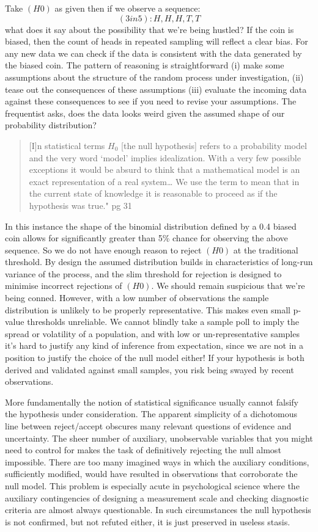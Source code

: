 \documentclass[]{tufte-book}
\theoremstyle{definition}
\theoremstyle{definition}
\theoremstyle{definition}
\theoremstyle{remark}
\begin{document}
Take \((H0)\) as given then if we observe a sequence: \[ (3in5): H, H, H, T, T\] what does it say about the possibility that we're being hustled? If the coin is biased, then the count of heads in repeated sampling will reflect a clear bias. For any new data we can check if the data is consistent with the data generated by the biased coin. The pattern of reasoning is straightforward (i) make some assumptions about the structure of the random process under investigation, (ii) tease out the consequences of these assumptions (iii) evaluate the incoming data against these consequences to see if you need to revise your assumptions. The frequentist asks, does the data looks weird given the assumed shape of our probability distribution?

\begin{quote}
{[}I{]}n statistical terms \(H_{0}\) {[}the null hypothesis{]} refers to a probability model and the very word `model' implies idealization. With a very few possible exceptions it would be absurd to think that a mathematical model is an exact representation of a real system\ldots{} We use the term to mean that in the current state of knowledge it is reasonable to proceed as if the hypothesis was true." pg 31 \citep{cox2006pos}
\end{quote}

In this instance the shape of the binomial distribution defined by a 0.4 biased coin allows for significantly greater than 5\% chance for observing the above sequence. So we do not have enough reason to reject \((H0)\) at the traditional threshold. By design the assumed distribution builds in characteristics of long-run variance of the process, and the slim threshold for rejection is designed to minimise incorrect rejections of \((H0)\). We should remain suspicious that we're being conned. However, with a low number of observations the sample distribution is unlikely to be properly representative. This makes even small p-value thresholds unreliable. We cannot blindly take a sample poll to imply the spread or volatility of a population, and with low or un-representative samples it's hard to justify any kind of inference from expectation, since we are not in a position to justify the choice of the null model either! If your hypothesis is both derived and validated against small samples, you risk being swayed by recent observations.

More fundamentally the notion of statistical significance usually cannot falsify the hypothesis under consideration. The apparent simplicity of a dichotomous line between reject/accept obscures many relevant questions of evidence and uncertainty. The sheer number of auxiliary, unobservable variables that you might need to control for makes the task of definitively rejecting the null almost impossible. There are too many imagined ways in which the auxiliary conditions, sufficiently modified, would have resulted in observations that corroborate the null model. This problem is especially acute in psychological science where the auxiliary contingencies of designing a measurement scale and checking diagnostic criteria are almost always questionable. In such circumstances the null hypothesis is not confirmed, but not refuted either, it is just preserved in useless stasis.
\end{document}
